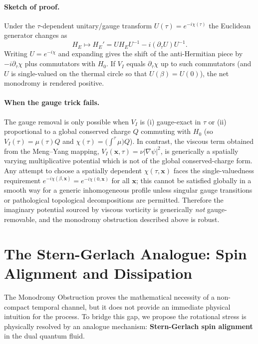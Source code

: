 \documentclass[11pt]{article}
\begin{document}
\paragraph{Sketch of proof.}
Under the \(\tau\)-dependent unitary/gauge transform \(U(\tau)=e^{-i\chi(\tau)}\) the Euclidean generator changes as
\[
H_E \mapsto H_E' = U H_E U^{-1} - i(\partial_\tau U)U^{-1} .
\]
Writing \(U=e^{-i\chi}\) and expanding gives the shift of the anti-Hermitian piece by \(-i\partial_\tau\chi\) plus commutators with \(H_0\). If \(V_I\) equals \(\partial_\tau\chi\) up to such commutators (and \(U\) is single-valued on the thermal circle so that \(U(\beta)=U(0)\)), the net monodromy is rendered positive.

\paragraph{When the gauge trick fails.}
The gauge removal is only possible when \(V_I\) is (i) gauge-exact in \(\tau\) or (ii) proportional to a global conserved charge \(Q\) commuting with \(H_0\) (so \(V_I(\tau)=\mu(\tau)Q\) and \(\chi(\tau)=\big(\int^\tau \mu\big)Q\)). In contrast, the viscous term obtained from the Meng--Yang mapping, \(V_I(\mathbf x,\tau)=\nu|\nabla\psi|^2\), is generically a spatially varying multiplicative potential which is not of the global conserved-charge form. Any attempt to choose a spatially dependent \(\chi(\tau,\mathbf x)\) faces the single-valuedness requirement \(e^{-i\chi(\beta,\mathbf x)}=e^{-i\chi(0,\mathbf x)}\) for all \(\mathbf x\); this cannot be satisfied globally in a smooth way for a generic inhomogeneous profile unless singular gauge transitions or pathological topological decompositions are permitted. Therefore the imaginary potential sourced by viscous vorticity is generically \emph{not} gauge-removable, and the monodromy obstruction described above is robust.

\section{The Stern-Gerlach\cite{SternGerlach1922} Analogue: Spin Alignment and Dissipation}


The Monodromy Obstruction proves the mathematical necessity of a non-compact temporal channel, but it does not provide an immediate physical intuition for the process. To bridge this gap, we propose the rotational stress is physically resolved by an analogue mechanism: \textbf{Stern-Gerlach\cite{SternGerlach1922} spin alignment} in the dual quantum fluid.
\end{document}
